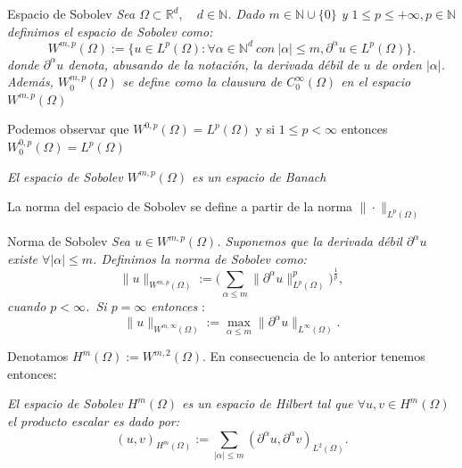 \begin{definicion1}[label={definicion1},nameref={Title or anything else}]{Espacio de Sobolev}
    \textit{Sea $\Omega \subset \mathbb R^{d},\quad d \in \mathbb N$. Dado $m \in \mathbb N \cup \{0\}$ y $1\leq p \leq +\infty, p \in \mathbb N$ definimos el espacio de Sobolev como:
    \begin{equation}
        W^{m,p}(\Omega):=\{u\in L^{p}(\Omega): \forall \alpha \in \mathbb N^{d} \ con \ |\alpha|\leq m, \partial^{\alpha}u\in L^{p}(\Omega)\}.
    \end{equation}
    donde $\partial^{\alpha}u$ denota, abusando de la notación, la derivada débil de $u$ de orden $|\alpha|$.
    Además, $W^{m,p}_{0}(\Omega)$ se define como la clausura de $C^{\infty}_{0}(\Omega)$ en el espacio $W^{m,p}(\Omega)$}
\end{definicion1}

Podemos observar que $W^{0,p}(\Omega)=L^{p}(\Omega)$ y si $1\leq p < \infty$ entonces $W^{0,p}_{0}(\Omega)=L^{p}(\Omega)$

\begin{teorema1}

\textit{El espacio de Sobolev $W^{m,p}(\Omega)$ es un espacio de Banach}
\end{teorema1}


La norma del espacio de Sobolev se define a partir de la norma $\displaystyle \|\cdot \|_{L^{p}(\Omega )}$

\begin{definicion1}[label={definicion1},nameref={Title or anything else}]{Norma de Sobolev}
    \textit{Sea $u \in W^{m,p}(\Omega)$. Suponemos que la derivada débil $\partial^{\alpha}u$ existe $\forall |\alpha|\leq m$. Definimos la norma de Sobolev como:
    $$\|u\|_{W^{m,p}(\Omega)}:=\big( \sum_{\alpha \leq m}\|\partial^{\alpha}u\|^{p}_{L^{p}(\Omega)})^{\frac{1}{p}},$$ cuando $p<\infty$.\
    Si $p=\infty$ entonces} :
    $$\|u\|_{W^{m,\infty}(\Omega)}:=\max_{\alpha \leq m}\|\partial^{\alpha}u\|_{L^{\infty}(\Omega)}. $$
\end{definicion1}

Denotamos $H^{m}(\Omega):=W^{m,2}(\Omega)$. En consecuencia de lo anterior tenemos entonces:

\begin{proposicion1}

\textit{ El espacio de Sobolev $H^{m}(\Omega)$ es un espacio de Hilbert tal que $\forall u,v \in H^{m}(\Omega)$ el producto escalar es dado por:
$$(u,v)_{H^{m}(\Omega)}:=\sum_{|\alpha|\leq m}(\partial^{\alpha}u,\partial^{\alpha}v)_{L^{2}(\Omega)}.$$
}
\end{proposicion1}

